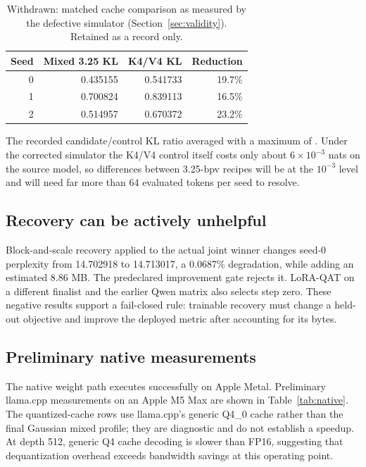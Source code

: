 \documentclass[10pt,twocolumn]{article}
\begin{document}
\begin{table}[t]
\centering
\small
\caption{Withdrawn: matched cache comparison as measured by the defective
simulator (Section~\ref{sec:validity}). Retained as a record only.}
\label{tab:matched}
\begin{tabular}{rrrr}
\toprule
Seed & Mixed 3.25 KL & K4/V4 KL & Reduction \\
\midrule
0 & 0.435155 & 0.541733 & 19.7\% \\
1 & 0.700824 & 0.839113 & 16.5\% \\
2 & 0.514957 & 0.670372 & 23.2\% \\
\bottomrule
\end{tabular}
\end{table}

The recorded candidate/control KL ratio averaged \MatchedCacheMeanRatio{} with
a maximum of \MatchedCacheWorstRatio{}. Under the corrected simulator the
K4/V4 control itself costs only about $6\times10^{-3}$ nats on the source
model, so differences between 3.25-bpv recipes will be at the $10^{-3}$ level
and will need far more than 64 evaluated tokens per seed to resolve.

\subsection{Recovery can be actively unhelpful}

Block-and-scale recovery applied to the actual joint winner changes seed-0
perplexity from 14.702918 to 14.713017, a 0.0687\% degradation, while adding an
estimated 8.86 MB. The predeclared improvement gate rejects it. LoRA-QAT on a
different finalist and the earlier Qwen matrix also selects step zero. These
negative results support a fail-closed rule: trainable recovery must change a
held-out objective and improve the deployed metric after accounting for its
bytes.

\subsection{Preliminary native measurements}

The native weight path executes successfully on Apple Metal. Preliminary
llama.cpp measurements on an Apple M5 Max are shown in
Table~\ref{tab:native}. The quantized-cache rows use llama.cpp's generic Q4\_0
cache rather than the final Gaussian mixed profile; they are diagnostic and do
not establish a speedup. At depth 512, generic Q4 cache decoding is slower than
FP16, suggesting that dequantization overhead exceeds bandwidth savings at this
operating point.
\end{document}
